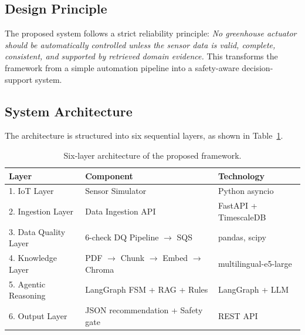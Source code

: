 \documentclass[runningheads]{llncs}
\begin{document}
\subsection{Design Principle}
The proposed system follows a strict reliability principle: \textit{No greenhouse actuator should be automatically controlled unless the sensor data is valid, complete, consistent, and supported by retrieved domain evidence.} This transforms the framework from a simple automation pipeline into a safety-aware decision-support system.

\subsection{System Architecture}
The architecture is structured into six sequential layers, as shown in Table~\ref{tab:architecture}.

\begin{table}[htbp]
\caption{Six-layer architecture of the proposed framework.}
\label{tab:architecture}
\centering
\begin{tabular}{|l|l|l|}
\hline
\textbf{Layer} & \textbf{Component} & \textbf{Technology} \\
\hline
1. IoT Layer & Sensor Simulator & Python asyncio \\
\hline
2. Ingestion Layer & Data Ingestion API & FastAPI + TimescaleDB \\
\hline
3. Data Quality Layer & 6-check DQ Pipeline $\rightarrow$ SQS & pandas, scipy \\
\hline
4. Knowledge Layer & PDF $\rightarrow$ Chunk $\rightarrow$ Embed $\rightarrow$ Chroma & multilingual-e5-large \\
\hline
5. Agentic Reasoning & LangGraph FSM + RAG + Rules & LangGraph + LLM \\
\hline
6. Output Layer & JSON recommendation + Safety gate & REST API \\
\hline
\end{tabular}
\end{table}
\end{document}
